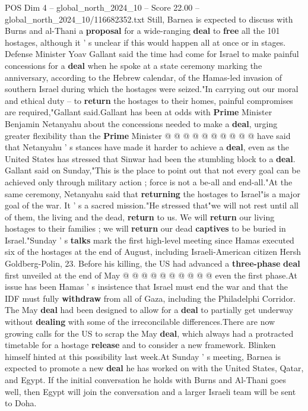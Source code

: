 \begin{textsample}{POS Dim 4 – global\_north\_2024\_10 – Score 22.00 – global\_north\_2024\_10/116682352.txt}
Still, Barnea is expected to discuss with Burns and al-Thani a \textbf{proposal} for a wide-ranging \textbf{deal} to \textbf{free} all the 101 hostages, although it ' s unclear if this would happen all at once or in stages.
Defense Minister Yoav Gallant said the time had come for Israel to make painful concessions for a \textbf{deal} when he spoke at a state ceremony marking the anniversary, according to the Hebrew calendar, of the Hamas-led invasion of southern Israel during which the hostages were seized."In carrying out our moral and ethical duty -- to \textbf{return} the hostages to their homes, painful compromises are required,"Gallant said.Gallant has been at odds with \textbf{Prime} Minister Benjamin Netanyahu about the concessions needed to make a \textbf{deal}, urging greater flexibility than the \textbf{Prime} Minister @ @ @ @ @ @ @ @ @ @ have said that Netanyahu ' s stances have made it harder to achieve a \textbf{deal}, even as the United States has stressed that Sinwar had been the stumbling block to a \textbf{deal}.
Gallant said on Sunday,"This is the place to point out that not every goal can be achieved only through military action ; force is not a be-all and end-all."At the same ceremony, Netanyahu said that \textbf{returning} the hostages to Israel"is a major goal of the war.
It ' s a sacred mission."He stressed that"we will not rest until all of them, the living and the dead, \textbf{return} to us.
We will \textbf{return} our living hostages to their families ; we will \textbf{return} our dead \textbf{captives} to be buried in Israel."Sunday ' s \textbf{talks} mark the first high-level meeting since Hamas executed six of the hostages at the end of August, including Israeli-American citizen Hersh Goldberg-Polin, 23.
Before his killing, the US had advanced a \textbf{three-phase} \textbf{deal} first unveiled at the end of May @ @ @ @ @ @ @ @ @ @ even the first phase.At issue has been Hamas ' s insistence that Israel must end the war and that the IDF must fully \textbf{withdraw} from all of Gaza, including the Philadelphi Corridor.
The May \textbf{deal} had been designed to allow for a \textbf{deal} to partially get underway without \textbf{dealing} with some of the irreconcilable differences.There are now growing calls for the US to scrap the May \textbf{deal}, which always had a protracted timetable for a hostage \textbf{release} and to consider a new framework.
Blinken himself hinted at this possibility last week.At Sunday ' s meeting, Barnea is expected to promote a new \textbf{deal} he has worked on with the United States, Qatar, and Egypt.
If the initial conversation he holds with Burns and Al-Thani goes well, then Egypt will join the conversation and a larger Israeli team will be sent to Doha.

\end{textsample}
